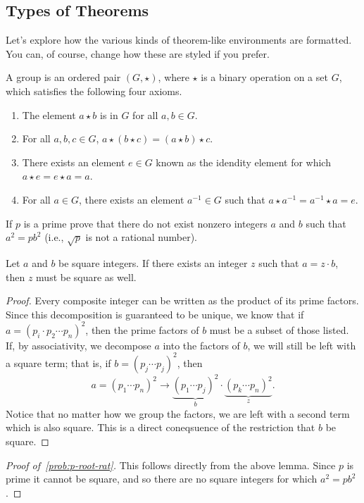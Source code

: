 \documentclass[code]{notes}
\begin{document}
	\subsection{Types of Theorems}
	Let's explore how the various kinds of theorem-like environments are formatted.
	You can, of course, change how these are styled if you prefer. \kant[1]
	\begin{definition}[Group]
		A group is an ordered pair $(G,\star)$, where $\star$ is a binary operation on a set $G$, which satisfies the following four axioms.
		\begin{enumerate}
			\item The element $a \star b$ is in $G$ for all $a,b \in G$.
			\item For all $a,b,c \in G$, $a \star (b \star c) = (a \star b) \star c$.
			\item There exists an element $e \in G$ known as the idendity element for which $a \star e = e \star a = a$.
			\item For all $a \in G$, there exists an element $a^{-1} \in G$ such that $a \star a^{-1} = a^{-1} \star a = e$.
		\end{enumerate}
	\end{definition}
	\kant[1]
	\begin{problem}\label{prob:p-root-rat}
			If $p$ is a prime prove that there do not exist nonzero integers $a$ and $b$ such that $a^2 = pb^2$ (i.e., $\sqrt{p}$ is not a rational number).
		\end{problem}
	\begin{lemma}
		Let $a$ and $b$ be square integers. If there exists an integer $z$ such that $a = z \cdot b$, then $z$ must be square as well.
	\end{lemma}
	\begin{proof}
		Every composite integer can be written as the product of its prime factors.
		Since this decomposition is guaranteed to be unique, we know that if $a = (p_i \cdot p_2 \cdots p_n)^2$, then the prime factors of $b$ must be a subset of those listed.
		If, by associativity, we decompose $a$ into the factors of $b$, we will still be left with a square term; that is, if $b = (p_j \cdots p_j)^2$, then 
		\[ a = (p_1 \cdots p_n)^2 \longrightarrow \underbrace{(p_1 \cdots p_j)^2}_{b} \cdot \underbrace{(p_k \cdots p_n)^2}_{z}. \]
		Notice that no matter how we group the factors, we are left with a second term which is also square.
		This is a direct coneqsuence of the restriction that $b$ be square.
	\end{proof}
	\begin{proof}[Proof of~\ref{prob:p-root-rat}]
	This follows directly from the above lemma. Since $p$ is prime it cannot be square, and so there are no square integers for which $a^2 = pb^2$.
	\end{proof}
\end{document}
